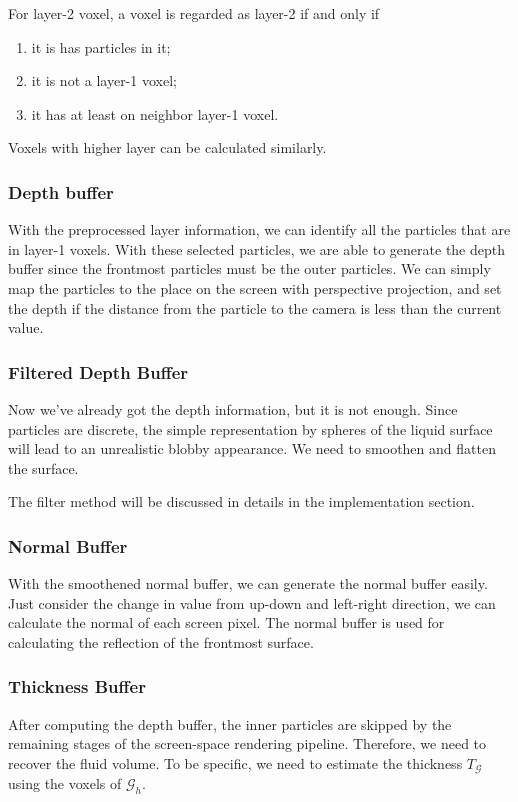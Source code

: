 \documentclass[sigconf]{acmart}
\begin{document}
For layer-2 voxel, a voxel is regarded as layer-2 if and only if
\begin{enumerate}
\item it is has particles in it;
\item it is not a layer-1 voxel;
\item it has at least on neighbor layer-1 voxel.
\end{enumerate}

Voxels with higher layer can be calculated similarly.

\subsubsection{Depth buffer}
With the preprocessed layer information, we can identify all the particles that are in layer-1 voxels. With these selected particles, we are able to generate the depth buffer since the frontmost particles must be the outer particles. We can simply map the particles to the place on the screen with perspective projection, and set the depth if the distance from the particle to the camera is less than the current value.

\subsubsection{Filtered Depth Buffer}
Now we've already got the depth information, but it is not enough. Since particles are discrete, the simple representation by spheres of the liquid surface will lead to an unrealistic blobby appearance. We need to smoothen and flatten the surface.

The filter method will be discussed in details in the implementation section.

\subsubsection{Normal Buffer}
With the smoothened normal buffer, we can generate the normal buffer easily. Just consider the change in value from up-down and left-right direction, we can calculate the normal of each screen pixel. The normal buffer is used for calculating the reflection of the frontmost surface.

\subsubsection{Thickness Buffer}
After computing the depth buffer, the inner particles are skipped by the remaining stages of the screen-space rendering pipeline. Therefore, we need to recover the fluid volume. To be specific, we need to estimate the thickness $T_{\mathcal{G}}$ using the voxels of $\mathcal{G}_h$.
\end{document}

